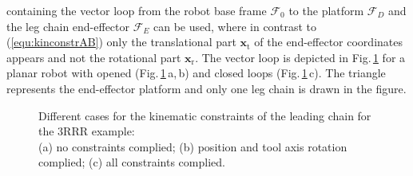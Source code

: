 \documentclass[robotics,article,submit,moreauthors,pdftex]{Definitions/mdpi}
\newcommand{\bm}[1]{\boldsymbol{#1}}
\newcommand{\ks}[1]{{\mathcal{F}}_{#1}}
\begin{document}
%
containing the vector loop from the robot base frame $\ks{0}$ to the platform $\ks{D}$ and the leg chain end-effector $\ks{E}$ can be used, where in contrast to (\ref{equ:kinconstrAB}) only the translational part $\bm{x}_{\mathrm{t}}$ of the end-effector coordinates appears and not the rotational part $\bm{x}_{\mathrm{r}}$.
The vector loop is depicted in Fig.\,\ref{fig:pkm_constr_rot_lead} for a planar robot with opened (Fig.\,\ref{fig:pkm_constr_rot_lead}\,a,\,b) and closed loops (Fig.\,\ref{fig:pkm_constr_rot_lead}\,c).
The triangle represents the end-effector platform and only one leg chain is drawn in the figure.
%
\begin{figure}[b]
	
	\caption{Different cases for the kinematic constraints of the leading chain for the 3RRR example:\\(a) no constraints complied; (b) position and tool axis rotation complied; (c) all constraints complied.}
	\label{fig:pkm_constr_rot_lead}
\end{figure} 
\end{document}
